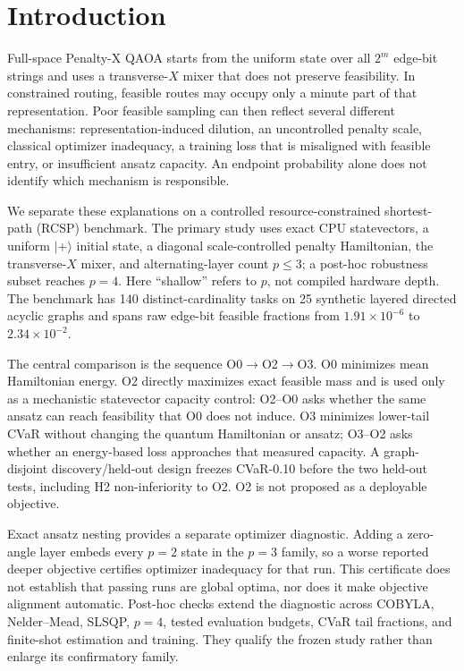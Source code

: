 \section{Introduction}
\label{sec:introduction}

Full-space Penalty-X QAOA starts from the uniform state over all $2^m$
edge-bit strings and uses a transverse-$X$ mixer that does not preserve
feasibility. In constrained routing, feasible routes may occupy only a minute
part of that representation. Poor feasible sampling can then reflect several
different mechanisms: representation-induced dilution, an uncontrolled
penalty scale, classical optimizer inadequacy, a training loss that is
misaligned with feasible entry, or insufficient ansatz capacity. An endpoint
probability alone does not identify which mechanism is responsible.

We separate these explanations on a controlled resource-constrained shortest-
path (RCSP) benchmark. The primary study uses exact CPU statevectors, a uniform
$\lvert+\rangle$ initial state, a diagonal scale-controlled penalty
Hamiltonian, the transverse-$X$ mixer, and alternating-layer count $p\leq3$;
a post-hoc robustness subset reaches $p=4$. Here ``shallow'' refers to $p$,
not compiled hardware depth. The benchmark has 140 distinct-cardinality tasks
on 25 synthetic layered directed acyclic graphs and spans raw edge-bit
feasible fractions from $1.91\times10^{-6}$ to $2.34\times10^{-2}$.

The central comparison is the sequence O0$\rightarrow$O2$\rightarrow$O3. O0
minimizes mean Hamiltonian energy. O2 directly maximizes exact feasible mass
and is used only as a mechanistic statevector capacity control: O2--O0 asks
whether the same ansatz can reach feasibility that O0 does not induce. O3
minimizes lower-tail CVaR without changing the quantum Hamiltonian or ansatz;
O3--O2 asks whether an energy-based loss approaches that measured capacity.
A graph-disjoint discovery/held-out design freezes CVaR-0.10 before the two
held-out tests, including H2 non-inferiority to O2. O2 is not proposed as a
deployable objective.

Exact ansatz nesting provides a separate optimizer diagnostic. Adding a
zero-angle layer embeds every $p=2$ state in the $p=3$ family, so a worse
reported deeper objective certifies optimizer inadequacy for that run. This
certificate does not establish that passing runs are global optima, nor does
it make objective alignment automatic. Post-hoc checks extend the diagnostic
across COBYLA, Nelder--Mead, SLSQP, $p=4$, tested evaluation budgets, CVaR tail
fractions, and finite-shot estimation and training. They qualify the frozen
study rather than enlarge its confirmatory family.

